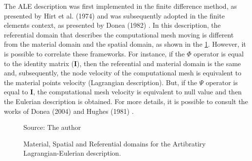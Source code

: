 \medskip
The ALE description was first implemented in the finite difference
 method, as presented by Hirt et al. (1974) \cite{hirt1974} 
and was subsequently adopted in the finite elements context, 
as presented by Donea (1982) \cite{donea1982}. In this description, 
the referential domain that describes the computational mesh moving 
is different from the material domain and the spatial domain, 
as shown in the \ref{referential domain}. 
However, it is possible to correlate these 
frameworks. For instance, if the $\Phi$ operator is equal to the 
identity matrix (\textbf{I}), then the referential and material domain 
is the same and, subsequently, the node velocity of the 
computational mesh 
is equivalent to the material points velocity (Lagrangian description). 
But, if the $\Psi$ operator is equal to \textbf{I}, the computational mesh
velocity is equivalent to null value and then the Eulerian description is
obtained. For more details, it is possible to consult the works 
of Donea (2004) \cite{donea2004} and Hughes (1981) \cite{hughes1981}.

\begin{figure}[H]
\caption{
Material, Spatial and Referential domains for the Artibratiry Lagrangian-Eulerian description.
}
\begin{center}
\end{center}
\vspace{-0.5cm}
\source Source: The author
\label{referential domain}
\end{figure}




